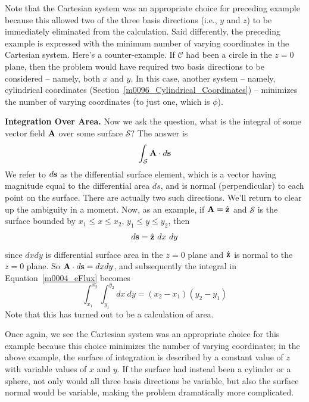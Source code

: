 Note that the Cartesian system was an appropriate choice for preceding example because this allowed two of the three basis directions (i.e., $y$ and $z$) to be immediately eliminated from the calculation. %
Said differently, the preceding example is expressed with the minimum number of varying coordinates in the Cartesian system.
Here's a counter-example. If ${\mathcal C}$ had been a circle in the $z=0$ plane, then the problem would have required two basis directions to be considered -- namely, both $x$ and $y$. In this case, another system -- namely, cylindrical coordinates (Section~\ref{m0096_Cylindrical_Coordinates}) -- minimizes the number of varying coordinates (to just one, which is $\phi$).  

{\bf Integration Over Area.}  
Now we ask the question, what is the integral of some vector field ${\bf A}$ over some surface ${\mathcal S}$?
The answer is
%
\begin{equation}
\int_{\mathcal S}{{\bf A} \cdot d{\bf s}}
\label{m0004_eFlux}
\end{equation} 
%
We refer to $d{\bf s}$ as the differential surface element, which is a vector having magnitude equal to the differential area $ds$, and is normal (perpendicular) to each point on the surface.
There are actually two such directions.  We'll return to clear up the ambiguity in a moment.
Now, as an example, if ${\bf A}=\hat{\bf z}$ and $\mathcal{S}$ is the surface bounded by $x_1\le x \le x_2$, $y_1\le y \le y_2$, then 
%
\begin{equation}
d{\bf s} = \hat{\bf z}~dx~dy
\end{equation}
%
since $dxdy$ is differential surface area in the $z=0$ plane and $\hat{\bf z}$ is normal to the $z=0$ plane.
So ${\bf A}\cdot d{\bf s}=dxdy$, and subsequently the integral in Equation~\ref{m0004_eFlux} becomes
%
\begin{equation}
\int_{x_1}^{x_2}\int_{y_1}^{y_2}{dx~dy} = \left(x_2-x_1\right)\left(y_2-y_1\right)
\end{equation} 
%
Note that this has turned out to be a calculation of area.

Once again, we see the Cartesian system was an appropriate choice for this example because this choice minimizes the number of varying coordinates; in the above example, the surface of integration is described by a constant value of $z$ with variable values of $x$ and $y$.
If the surface had instead been a cylinder or a sphere, not only would all three basis directions be variable, but also the surface normal would be variable, making the problem dramatically more complicated.  

